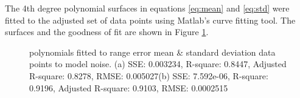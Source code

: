 		The 4th degree polynomial surfaces in equations \ref{eq:mean} and \ref{eq:std} were fitted to the adjusted set of data points using Matlab's curve fitting tool. The surfaces and the goodness of fit are shown in Figure \ref{fig:surface_range_error}. 
		\begin{figure}
	  		\centering
	  		\caption{polynomials fitted to range error mean \& standard deviation data points to model noise. (a) SSE: 0.003234, R-square: 0.8447, Adjusted R-square: 0.8278, RMSE: 0.005027(b) SSE: 7.592e-06, R-square: 0.9196, Adjusted R-square: 0.9103, RMSE: 0.0002515}
	  		\label{fig:surface_range_error}
		\end{figure}
		
